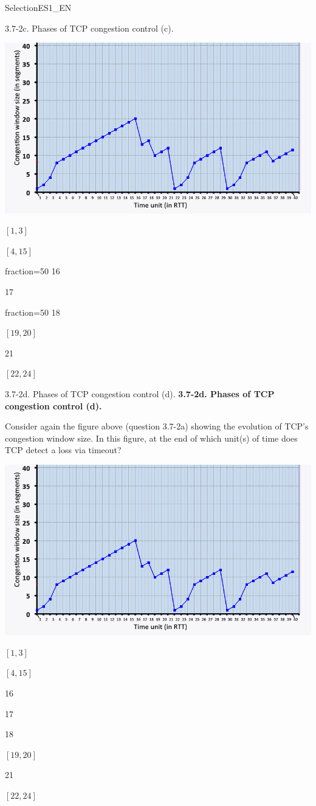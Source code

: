 \documentclass[a4paper]{article}
\begin{document}
\begin{quiz}{SelectionES1\_EN}
\begin{multi}[points=1,shuffle,multiple]{3.7-2c. Phases of TCP congestion control (c).}
\begin{center}
	\includegraphics[width=\linewidth]{figs/tcp_cc_evolution.jpg}
\end{center}
\item $[1,3]$
\item $[4,15]$
\item[fraction=50] 16
\item 17
\item[fraction=50] 18
\item $[19,20]$
\item 21
\item $[22,24]$
\end{multi}

\begin{multi}[points=1,shuffle]{3.7-2d. Phases of TCP congestion control (d).}
\textbf{3.7-2d. Phases of TCP congestion control (d).} 

Consider again the figure above (question 3.7-2a) showing the evolution of TCP's congestion window size. In this figure, at the end of which unit(s) of time does TCP detect a loss via timeout? 

\begin{center}
	\includegraphics[width=\linewidth]{figs/tcp_cc_evolution.jpg}
\end{center}
\item $[1,3]$
\item $[4,15]$
\item 16
\item 17
\item 18
\item $[19,20]$
\item* 21
\item $[22,24]$
\end{multi}


\end{quiz}
\end{document}
